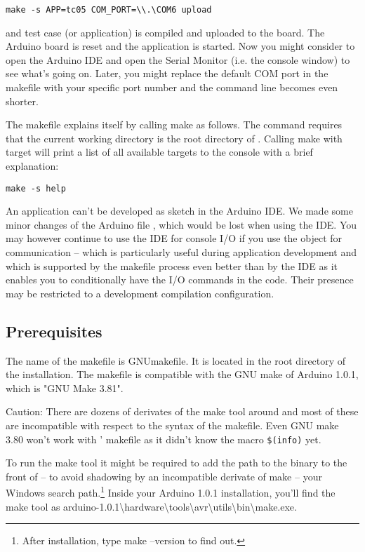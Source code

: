 \verb+make -s APP=tc05 COM_PORT=\\.\COM6 upload+

and test case (or application)  is compiled and uploaded
to the board. The Arduino board is reset and the \rtos{} application is
started. Now you might consider to open the Arduino IDE and open the
Serial Monitor (i.e. the console window) to see what's going on. Later,
you might replace the default COM port in the makefile with your specific
port number and the command line becomes even shorter.

The makefile explains itself by calling make as follows. The command
requires that the current working directory is the root directory of
\rtos{}. Calling make with target  will print a list of all
available targets to the console with a brief explanation:

\verb+make -s help+

An \rtos{} application can't be developed as sketch in the Arduino IDE. We
made some minor changes of the Arduino file , which would be
lost when using the IDE. You may however continue to use the IDE for
console I/O if you use the object  for communication --
which is particularly useful during application development and which is
supported by the makefile process even better than by the IDE as it
enables you to conditionally have the I/O commands in the code. Their
presence may be restricted to a development compilation configuration.


\subsection{Prerequisites}
\label{secPrerequisites}

The name of the makefile is GNUmakefile. It is located in the root
directory of the \rtos{} installation. The makefile is compatible with the
GNU make of Arduino 1.0.1, which is "GNU Make 3.81".

Caution: There are dozens of derivates of the make tool around and most
of these are incompatible with respect to the syntax of the makefile. Even
GNU make 3.80 won't work with \rtos' makefile as it didn't know the
macro \verb+$(info)+ yet.

To run the make tool it might be required to add the path to the binary to
the front of -- to avoid shadowing by an incompatible derivate of make --
your Windows search path.\footnote{After installation, type make --version
to find out.} Inside your Arduino 1.0.1 installation, you'll find the make
tool as
arduino-1.0.1\textbackslash\-hard\-ware\textbackslash\-tools\textbackslash\-avr\textbackslash\-utils\textbackslash\-bin\textbackslash\-make.exe.


